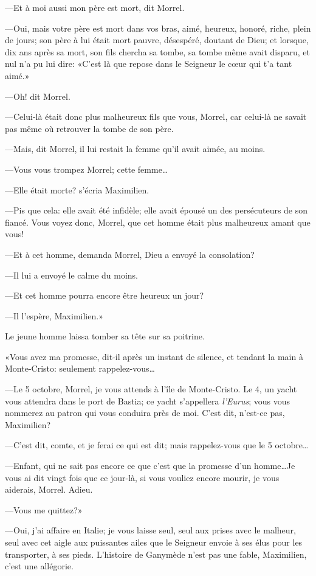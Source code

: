 —Et à moi aussi mon père est mort, dit Morrel. 

—Oui, mais votre père est mort dans vos bras, aimé, heureux, honoré, riche, plein de jours; son père à lui était mort pauvre, désespéré, doutant de Dieu; et lorsque, dix ans après sa mort, son fils chercha sa tombe, sa tombe même avait disparu, et nul n'a pu lui dire: «C'est là que repose dans le Seigneur le cœur qui t'a tant aimé.» 

—Oh! dit Morrel. 

—Celui-là était donc plus malheureux fils que vous, Morrel, car celui-là ne savait pas même où retrouver la tombe de son père. 

—Mais, dit Morrel, il lui restait la femme qu'il avait aimée, au moins. 

—Vous vous trompez Morrel; cette femme\dots 

—Elle était morte? s'écria Maximilien. 

—Pis que cela: elle avait été infidèle; elle avait épousé un des persécuteurs de son fiancé. Vous voyez donc, Morrel, que cet homme était plus malheureux amant que vous! 

—Et à cet homme, demanda Morrel, Dieu a envoyé la consolation? 

—Il lui a envoyé le calme du moins. 

—Et cet homme pourra encore être heureux un jour? 

—Il l'espère, Maximilien.» 

Le jeune homme laissa tomber sa tête sur sa poitrine. 

«Vous avez ma promesse, dit-il après un instant de silence, et tendant la main à Monte-Cristo: seulement rappelez-vous\dots 

—Le 5 octobre, Morrel, je vous attends à l'île de Monte-Cristo. Le 4, un yacht vous attendra dans le port de Bastia; ce yacht s'appellera \textit{l'Eurus}; vous vous nommerez au patron qui vous conduira près de moi. C'est dit, n'est-ce pas, Maximilien? 

—C'est dit, comte, et je ferai ce qui est dit; mais rappelez-vous que le 5 octobre\dots 

—Enfant, qui ne sait pas encore ce que c'est que la promesse d'un homme\dots Je vous ai dit vingt fois que ce jour-là, si vous vouliez encore mourir, je vous aiderais, Morrel. Adieu. 

—Vous me quittez?» 

—Oui, j'ai affaire en Italie; je vous laisse seul, seul aux prises avec le malheur, seul avec cet aigle aux puissantes ailes que le Seigneur envoie à ses élus pour les transporter, à ses pieds. L'histoire de Ganymède n'est pas une fable, Maximilien, c'est une allégorie. 

